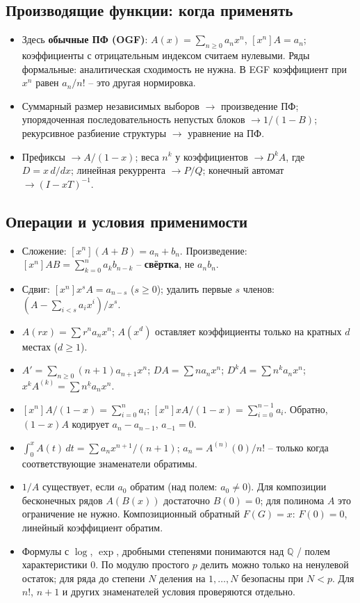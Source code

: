 \subsection{Производящие функции: когда применять}
\begin{itemize}[leftmargin=*, nosep]
\item Здесь \textbf{обычные ПФ (OGF)}: $A(x)=\sum_{n\ge0}a_nx^n$, $[x^n]A=a_n$; коэффициенты с отрицательным индексом считаем нулевыми. Ряды формальные: аналитическая сходимость не нужна. В EGF коэффициент при $x^n$ равен $a_n/n!$ -- это другая нормировка.
\item Суммарный размер независимых выборов $\to$ произведение ПФ; упорядоченная последовательность непустых блоков $\to 1/(1-B)$; рекурсивное разбиение структуры $\to$ уравнение на ПФ.
\item Префиксы $\to A/(1-x)$; веса $n^k$ у коэффициентов $\to D^k A$, где $D=x\,d/dx$; линейная рекуррента $\to P/Q$; конечный автомат $\to (I-xT)^{-1}$.
\end{itemize}

\subsection{Операции и условия применимости}
\begin{itemize}[leftmargin=*, nosep]
\item Сложение: $[x^n](A+B)=a_n+b_n$. Произведение: $[x^n]AB=\sum_{k=0}^n a_kb_{n-k}$ -- \textbf{свёртка}, не $a_nb_n$.
\item Сдвиг: $[x^n]x^sA=a_{n-s}$ ($s\ge0$); удалить первые $s$ членов: $(A-\sum_{i<s}a_ix^i)/x^s$.
\item $A(rx)=\sum r^na_nx^n$; $A(x^d)$ оставляет коэффициенты только на кратных $d$ местах ($d\ge1$).
\item $A'=\sum_{n\ge0}(n+1)a_{n+1}x^n$; $DA=\sum na_nx^n$; $D^kA=\sum n^ka_nx^n$; $x^kA^{(k)}=\sum n^{\underline k}a_nx^n$.
\item $[x^n]A/(1-x)=\sum_{i=0}^na_i$; $[x^n]xA/(1-x)=\sum_{i=0}^{n-1}a_i$. Обратно, $(1-x)A$ кодирует $a_n-a_{n-1}$, $a_{-1}=0$.
\item $\int_0^x A(t)\,dt=\sum a_nx^{n+1}/(n+1)$; $a_n=A^{(n)}(0)/n!$ -- только когда соответствующие знаменатели обратимы.
\item $1/A$ существует, если $a_0$ обратим (над полем: $a_0\ne0$). Для композиции бесконечных рядов $A(B(x))$ достаточно $B(0)=0$; для полинома $A$ это ограничение не нужно. Композиционный обратный $F(G)=x$: $F(0)=0$, линейный коэффициент обратим.
\item Формулы с $\log$, $\exp$, дробными степенями понимаются над $\mathbb Q$ / полем характеристики 0. По модулю простого $p$ делить можно только на ненулевой остаток; для ряда до степени $N$ деления на $1,\ldots,N$ безопасны при $N<p$. Для $n!$, $n+1$ и других знаменателей условия проверяются отдельно.
\end{itemize}

